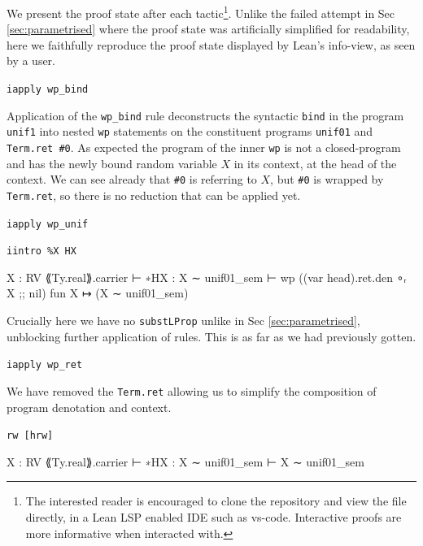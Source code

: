 We present the proof state after each tactic\footnote{The interested reader is encouraged to clone the repository and view the file  directly, in a Lean LSP enabled IDE such as vs-code.
Interactive proofs are more informative when interacted with.}. Unlike the failed attempt in Sec \ref{sec:parametrised} where the proof state was artificially simplified for readability, here we faithfully reproduce the proof state
displayed by Lean's info-view, as seen by a user.

\texttt{iapply wp\_bind}

Application of the \texttt{wp\_bind} rule deconstructs the syntactic \texttt{bind} in the program \texttt{unif1} into nested \texttt{wp}
statements on the constituent programs \texttt{unif01} and \texttt{Term.ret \#0}. As expected the program of the inner \texttt{wp}
is not a closed-program and has the newly bound random variable $X$ in its context, at the head of the context. We can see already that
\texttt{\#0} is referring to $X$, but \texttt{\#0} is wrapped by \texttt{Term.ret}, so there is no reduction that can be applied yet.

\texttt{iapply wp\_unif}

\texttt{iintro \%X HX}
\begin{leancode}
X : RV ⟪Ty.real⟫.carrier
⊢ 
∗HX : X ∼ unif01_sem
⊢ wp ((var head).ret.den ∘ᵣ X ;; nil) fun X ↦ (X ∼ unif01_sem)
\end{leancode}

Crucially here we have no \texttt{substLProp} unlike in Sec \ref{sec:parametrised}, unblocking
further application of rules. This is as far as we had previously gotten. 

\texttt{iapply wp\_ret}

We have removed the \texttt{Term.ret} allowing us to simplify the composition of program denotation and context.

\texttt{rw [hrw]}
\begin{leancode}
X : RV ⟪Ty.real⟫.carrier
⊢ 
∗HX : X ∼ unif01_sem
⊢ X ∼ unif01_sem
\end{leancode}

